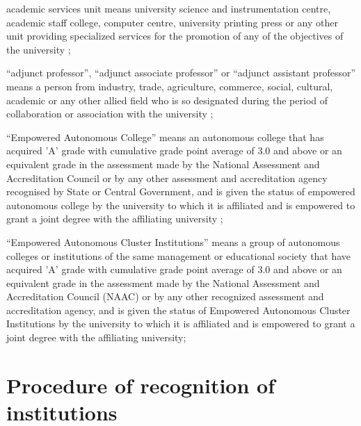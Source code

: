 \documentclass[gaz5a]{mhact}
\begin{document}
      \begin{subsectionlist}
    

academic services unit means university science and instrumentation centre, academic staff college, computer centre, university printing press or any other unit providing specialized services for the promotion of any of the objectives of the university ;

      


``adjunct professor'', ``adjunct associate professor'' or ``adjunct assistant professor'' means a person from industry, trade, agriculture, commerce, social, cultural, academic or any other allied field who is so designated during the period of collaboration or association with the university ;

      


``Empowered Autonomous College'' means an autonomous college that has acquired 'A' grade with cumulative grade point average of 3.0 and above or an equivalent grade in the assessment made by the National Assessment and Accreditation Council or by any other assessment and accreditation agency recognised by State or Central Government, and is given the status of empowered autonomous college by the university to which it is affiliated and is empowered to grant a joint degree with the affiliating university ;

      

``Empowered Autonomous Cluster Institutions'' means a group of autonomous colleges or institutions of the same management or educational society that have acquired 'A' grade with cumulative grade point average of 3.0 and above or an equivalent grade in the assessment made by the National Assessment and Accreditation Council (NAAC) or by any other recognized assessment and accreditation agency, and is given the status of Empowered Autonomous Cluster Institutions by the university to which it is affiliated and is empowered to grant a joint degree with the affiliating university;

      
       \end{subsectionlist}
    
      \section{Procedure of recognition of institutions}
      
\end{document}
